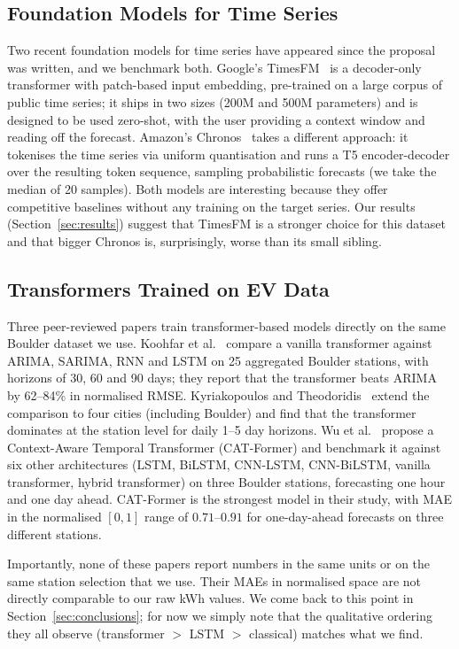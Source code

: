 \subsection{Foundation Models for Time Series}

Two recent foundation models for time series have appeared since the
proposal was written, and we benchmark both. Google's
TimesFM~\cite{das2024timesfm} is a decoder-only transformer with
patch-based input embedding, pre-trained on a large corpus of public
time series; it ships in two sizes (200M and 500M parameters) and is
designed to be used zero-shot, with the user providing a context
window and reading off the forecast. Amazon's
Chronos~\cite{ansari2024chronos} takes a different approach: it
tokenises the time series via uniform quantisation and runs a T5
encoder-decoder over the resulting token sequence, sampling
probabilistic forecasts (we take the median of 20 samples). Both
models are interesting because they offer competitive baselines
without any training on the target series. Our results
(Section~\ref{sec:results}) suggest that TimesFM is a stronger choice
for this dataset and that bigger Chronos is, surprisingly, worse than
its small sibling.

\subsection{Transformers Trained on EV Data}

Three peer-reviewed papers train transformer-based models directly on
the same Boulder dataset we use. Koohfar et
al.~\cite{koohfar2023transformer} compare a vanilla transformer
against ARIMA, SARIMA, RNN and LSTM on 25 aggregated Boulder stations,
with horizons of 30, 60 and 90 days; they report that the transformer
beats ARIMA by 62--84\% in normalised RMSE.
Kyriakopoulos and Theodoridis~\cite{kyriakopoulos2025comparative}
extend the comparison to four cities (including Boulder) and find that
the transformer dominates at the station level for daily 1--5 day
horizons. Wu et al.~\cite{wu2025catformer} propose a Context-Aware
Temporal Transformer (CAT-Former) and benchmark it against six other
architectures (LSTM, BiLSTM, CNN-LSTM, CNN-BiLSTM, vanilla
transformer, hybrid transformer) on three Boulder stations,
forecasting one hour and one day ahead. CAT-Former is the strongest
model in their study, with MAE in the normalised $[0,1]$ range of
$0.71$--$0.91$ for one-day-ahead forecasts on three different
stations.

Importantly, none of these papers report numbers in the same units or
on the same station selection that we use. Their MAEs in normalised
space are not directly comparable to our raw kWh values. We come back
to this point in Section~\ref{sec:conclusions}; for now we simply note
that the qualitative ordering they all observe (transformer $>$ LSTM
$>$ classical) matches what we find.

